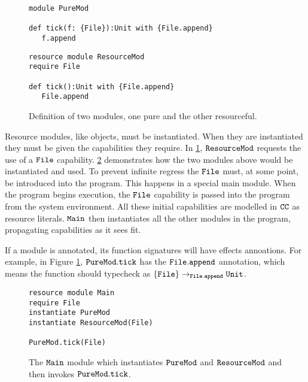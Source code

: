 \begin{figure}[h]

\begin{lstlisting}
module PureMod

def tick(f: {File}):Unit with {File.append}
   f.append

\end{lstlisting}

\begin{lstlisting}
resource module ResourceMod
require File

def tick():Unit with {File.append}
   File.append
\end{lstlisting}

\caption{Definition of two modules, one pure and the other resourceful.}
\label{fig:wyv_modules}
\end{figure}

Resource modules, like objects, must be instantiated. When they are instantiated they must be given the capabilities they require. In \ref{fig:wyv_modules}, $\mathtt{ResourceMod}$ requests the use of a $\mathtt{File}$ capability. \ref{fig:wyv_module_instantiation} demonstrates how the two modules above would be instantiated and used. To prevent infinite regress the $\mathtt{File}$ must, at some point, be introduced into the program. This happens in a special main module. When the program begins execution, the $\mathtt{File}$ capability is passed into the program from the system environment. All these initial capabilities are modelled in $\mathtt{CC}$ as resource literals. $\mathtt{Main}$ then instantiates all the other modules in the program, propagating capabilities as it sees fit.

If a module is annotated, its function signatures will have effects annoations. For example, in Figure \ref{fig:wyv_modules}, $\mathtt{PureMod.tick}$ has the $\mathtt{File.append}$ annotation, which means the function should typecheck as $\mathtt{ \{ File \} \rightarrow_{\mathtt{File.append}} \mathtt{Unit} }$. 


\begin{figure}[h]

\begin{lstlisting}
resource module Main
require File
instantiate PureMod
instantiate ResourceMod(File)

PureMod.tick(File)
\end{lstlisting}

\caption{The $\mathtt{Main}$ module which instantiates $\mathtt{PureMod}$ and $\mathtt{ResourceMod}$ and then invokes $\mathtt{PureMod.tick}$.}
\label{fig:wyv_module_instantiation}
\end{figure}


